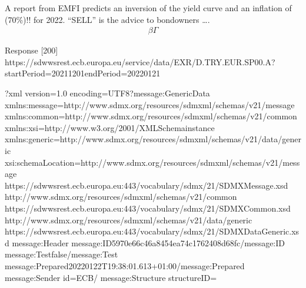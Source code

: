 \documentclass[letterpaper,10pt,english]{sphinxmanual}
\begin{document}
\sphinxAtStartPar
A report from EMFI predicts an inversion of the yield curve and an
inflation of (70\%)!! for 2022. “SELL” is the advice to bondowners ….
\begin{equation*}
\begin{split}\beta\Gamma\end{split}
\end{equation*}
\begin{sphinxVerbatim}[commandchars=\\\{\}]
\end{sphinxVerbatim}

\begin{sphinxVerbatim}[commandchars=\\\{\}]
\PYGZlt{}Response [200]\PYGZgt{}
https://sdw\PYGZhy{}wsrest.ecb.europa.eu/service/data/EXR/D.TRY.EUR.SP00.A?startPeriod=2021\PYGZhy{}12\PYGZhy{}01\PYGZam{}endPeriod=2022\PYGZhy{}01\PYGZhy{}21
\end{sphinxVerbatim}

\begin{sphinxVerbatim}[commandchars=\\\{\}]
\PYGZlt{}?xml version=\PYGZdq{}1.0\PYGZdq{} encoding=\PYGZdq{}UTF\PYGZhy{}8\PYGZdq{}?\PYGZgt{}\PYGZlt{}message:GenericData xmlns:message=\PYGZdq{}http://www.sdmx.org/resources/sdmxml/schemas/v2\PYGZus{}1/message\PYGZdq{} xmlns:common=\PYGZdq{}http://www.sdmx.org/resources/sdmxml/schemas/v2\PYGZus{}1/common\PYGZdq{} xmlns:xsi=\PYGZdq{}http://www.w3.org/2001/XMLSchema\PYGZhy{}instance\PYGZdq{} xmlns:generic=\PYGZdq{}http://www.sdmx.org/resources/sdmxml/schemas/v2\PYGZus{}1/data/generic\PYGZdq{} xsi:schemaLocation=\PYGZdq{}http://www.sdmx.org/resources/sdmxml/schemas/v2\PYGZus{}1/message https://sdw\PYGZhy{}wsrest.ecb.europa.eu:443/vocabulary/sdmx/2\PYGZus{}1/SDMXMessage.xsd http://www.sdmx.org/resources/sdmxml/schemas/v2\PYGZus{}1/common https://sdw\PYGZhy{}wsrest.ecb.europa.eu:443/vocabulary/sdmx/2\PYGZus{}1/SDMXCommon.xsd http://www.sdmx.org/resources/sdmxml/schemas/v2\PYGZus{}1/data/generic https://sdw\PYGZhy{}wsrest.ecb.europa.eu:443/vocabulary/sdmx/2\PYGZus{}1/SDMXDataGeneric.xsd\PYGZdq{}\PYGZgt{}
\PYGZlt{}message:Header\PYGZgt{}
\PYGZlt{}message:ID\PYGZgt{}5970e66c\PYGZhy{}46a8\PYGZhy{}454e\PYGZhy{}a74c\PYGZhy{}1762408d68fc\PYGZlt{}/message:ID\PYGZgt{}
\PYGZlt{}message:Test\PYGZgt{}false\PYGZlt{}/message:Test\PYGZgt{}
\PYGZlt{}message:Prepared\PYGZgt{}2022\PYGZhy{}01\PYGZhy{}22T19:38:01.613+01:00\PYGZlt{}/message:Prepared\PYGZgt{}
\PYGZlt{}message:Sender id=\PYGZdq{}ECB\PYGZdq{}/\PYGZgt{}
\PYGZlt{}message:Structure structureID=\PYGZdq{}
\end{sphinxVerbatim}
\end{document}
